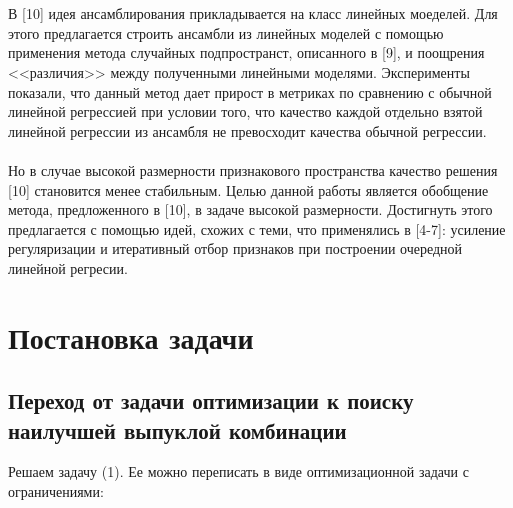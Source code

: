 \documentclass{article}
\begin{document}
\\ \\
В [10] идея ансамблирования прикладывается на класс линейных моеделей. Для этого предлагается строить ансамбли из линейных моделей с помощью применения метода случайных подпространст, описанного в [9], и поощрения <<различия>> между полученными линейными моделями. Эксперименты показали, что данный метод дает прирост в метриках по сравнению с обычной линейной регрессией при условии того, что качество каждой отдельно взятой линейной регрессии из ансамбля не превосходит качества обычной регрессии. 
\\ \\
Но в случае высокой размерности признакового пространства качество решения [10] становится менее стабильным. Целью данной работы является обобщение метода, предложенного в [10], в задаче высокой размерности. Достигнуть этого предлагается с помощью идей, схожих с теми, что применялись в [4-7]: усиление регуляризации и итеративный отбор признаков при построении очередной линейной регресии.
\newpage
\section{Постановка задачи}

\subsection{Переход от задачи оптимизации к поиску наилучшей выпуклой комбинации}
Решаем задачу (1). Ее можно переписать в виде оптимизационной задачи с ограничениями:
\end{document}
